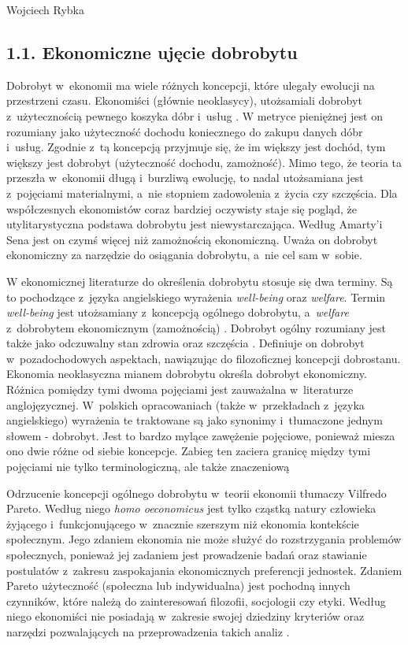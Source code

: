 \begin{artplenv}{Wojciech Rybka}
\subsection{1.1. Ekonomiczne ujęcie dobrobytu}
Dobrobyt w~ekonomii ma wiele różnych koncepcji, które ulegały ewolucji na przestrzeni czasu. Ekonomiści (głównie
neoklasycy), utożsamiali dobrobyt z~użytecznością pewnego koszyka dóbr i~usług
\parencite{kot_dobrobyt_2004}.
W metryce pieniężnej jest on rozumiany jako użyteczność dochodu koniecznego do zakupu danych dóbr i~usług.
Zgodnie z~tą koncepcją przyjmuje się, że im większy jest dochód, tym większy jest dobrobyt (użyteczność dochodu,
zamożność). Mimo tego, że teoria ta przeszła w~ekonomii długą  i~burzliwą ewolucję, to nadal utożsamiana
jest z~pojęciami materialnymi, a~nie stopniem zadowolenia z~życia czy szczęścia. Dla współczesnych ekonomistów coraz bardziej
oczywisty staje się pogląd, że utylitarystyczna podstawa dobrobytu jest niewystarczająca. Według Amarty’i Sena jest on
czymś więcej niż zamożnością ekonomiczną. Uważa on dobrobyt ekonomiczny za narzędzie do osiągania dobrobytu, a~nie cel
sam w~sobie. 

W ekonomicznej literaturze do określenia dobrobytu stosuje się dwa terminy. Są to pochodzące z~języka angielskiego
wyrażenia \textit{well-being} oraz \textit{welfare}. Termin \textit{well-being} jest utożsamiany z~koncepcją ogólnego
dobrobytu, a~\textit{welfare} z~dobrobytem ekonomicznym (zamożnością)
\parencite{kot_dobrobyt_2004}.
Dobrobyt ogólny rozumiany jest także jako odczuwalny stan zdrowia oraz szczęścia
\parencite{noauthor_well-being_2019}.
Definiuje on dobrobyt w~pozadochodowych aspektach, nawiązując do filozoficznej koncepcji dobrostanu. Ekonomia
neoklasyczna mianem dobrobytu określa dobrobyt ekonomiczny. Różnica pomiędzy tymi dwoma pojęciami jest
zauważalna w~literaturze anglojęzycznej. W~polskich opracowaniach (także w~przekładach z~języka angielskiego) wyrażenia te
traktowane są jako synonimy  i~tłumaczone jednym słowem - dobrobyt. Jest to bardzo mylące zawężenie pojęciowe, ponieważ
miesza ono dwie różne od siebie koncepcje. Zabieg ten zaciera granicę między tymi pojęciami nie tylko terminologiczną,
ale także znaczeniową

Odrzucenie koncepcji ogólnego dobrobytu w~teorii ekonomii tłumaczy Vilfredo Pareto. Według niego \textit{homo
oeconomicus} jest tylko cząstką natury człowieka żyjącego  i~funkcjonującego w~znacznie szerszym niż ekonomia
kontekście społecznym. Jego zdaniem ekonomia nie może służyć do rozstrzygania problemów społecznych, ponieważ jej
zadaniem jest prowadzenie badań oraz stawianie postulatów z~zakresu zaspokajania ekonomicznych preferencji jednostek.
Zdaniem Pareto użyteczność (społeczna lub indywidualna) jest pochodną innych czynników, które należą do zainteresowań
filozofii, socjologii czy etyki. Według niego ekonomiści nie posiadają w~zakresie swojej dziedziny kryteriów oraz
narzędzi pozwalających na przeprowadzenia takich analiz
\parencite{czech_ekonomia_2014}.


\end{artplenv}

